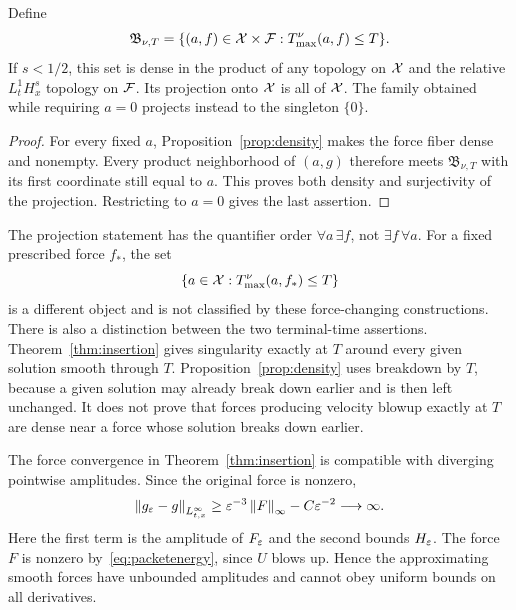 \begin{proposition}\label{prop:projection}
Define
\[
 \mathfrak B_{\nu,T}
 =\{(a,f)\in\mathcal X\times\mathcal F:T_{\max}^{\nu}(a,f)\le T\}.
\]
If $s<1/2$, this set is dense in the product of any topology on $\mathcal X$ and the relative $L^1_tH^s_x$ topology on $\mathcal F$. Its projection onto $\mathcal X$ is all of $\mathcal X$.
The family obtained while requiring $a=0$ projects instead to the singleton $\{0\}$.
\end{proposition}
\begin{proof}
For every fixed $a$, Proposition~\ref{prop:density} makes the force fiber
dense and nonempty. Every product neighborhood of $(a,g)$ therefore meets
$\mathfrak B_{\nu,T}$ with its first coordinate still equal to $a$.
This proves both density and surjectivity of the projection. Restricting
to $a=0$ gives the last assertion.
\end{proof}

The projection statement has the quantifier order
$\forall a\,\exists f$, not $\exists f\,\forall a$.
For a fixed prescribed force $f_*$, the set
\[
 \{a\in\mathcal X:T_{\max}^{\nu}(a,f_*)\le T\}
\]
is a different object and is not classified by these force-changing constructions.
There is also a distinction between the two terminal-time assertions.
Theorem~\ref{thm:insertion} gives singularity exactly at $T$ around every given solution smooth through $T$. Proposition~\ref{prop:density} uses breakdown by $T$, because a given solution may already break down earlier and is then left unchanged. It does not prove that forces producing velocity blowup exactly at $T$
are dense near a force whose solution breaks down earlier.
\begin{remark}\label{rem:peaks}
The force convergence in Theorem~\ref{thm:insertion} is compatible with diverging pointwise amplitudes. Since the original force is nonzero,
\[
 \left\lVert g_\varepsilon-g\right\rVert_{L^\infty_{t,x}}
 \ge\varepsilon^{-3}\left\lVert F\right\rVert_\infty-C\varepsilon^{-2}\longrightarrow\infty.
\]
Here the first term is the amplitude of $F_\varepsilon$ and the second bounds $H_\varepsilon$. The force $F$ is nonzero by~\eqref{eq:packetenergy}, since $U$ blows up. Hence the approximating smooth forces have unbounded amplitudes and cannot obey uniform bounds on all derivatives.
\end{remark}

